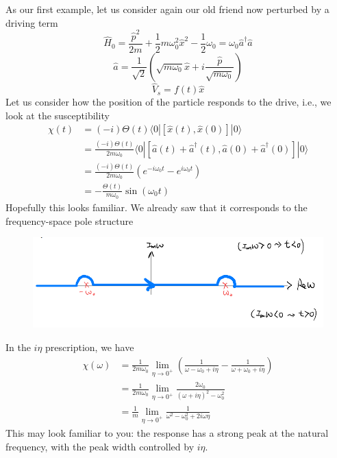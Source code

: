 As our first example, let us consider again our old friend now perturbed by a driving term
\[ \hat{H}_0=\frac{\hat{p}^2}{2m}+\frac{1}{2}m\omega _{0}^{2}\hat{x}^2-\frac{1}{2}\omega _0=\omega _0\hat{a}^{\dagger}\hat{a}\]
\[ \hat{a}=\frac{1}{\sqrt{2}}\left( \sqrt{m\omega _0}\hat{x}+i\frac{\hat{p}}{\sqrt{m\omega _0}} \right) \]
\[ \hat{V}_s=f\left( t \right) \hat{x}\]
Let us consider how the position of the particle responds to the drive, i.e., we look at the susceptibility
\begin{align*}
    \chi \left( t \right) &=\left( -i \right) \Theta \left( t \right) \langle 0|\left[ \hat{x}\left( t \right) ,\hat{x}\left( 0 \right) \right] |0\rangle \\
    &=\frac{\left( -i \right) \Theta \left( t \right)}{2m\omega _0}\langle 0|\left[ \hat{a}\left( t \right) +\hat{a}^{\dagger}\left( t \right) ,\hat{a}\left( 0 \right) +\hat{a}^{\dagger}\left( 0 \right) \right] |0\rangle \\
    &=\frac{\left( -i \right) \Theta \left( t \right)}{2m\omega _0}\left( e^{-i\omega _0t}-e^{i\omega _0t} \right) \\
    &=-\frac{\Theta \left( t \right)}{m\omega _0}\sin \left( \omega _0t \right)
\end{align*}
Hopefully this looks familiar. We already saw that it corresponds to the frequency-space pole structure

\begin{figure}[ht]
    \centering
    \includegraphics[width=\textwidth]{jupyterbook/data/fig/lec13-fig00.png}
\end{figure}

In the $i\eta$ prescription, we have
\begin{align*}
    \chi \left( \omega \right) &=\frac{1}{2m\omega _0}\lim_{\eta \rightarrow 0^+} \left( \frac{1}{\omega -\omega _0+i\eta}-\frac{1}{\omega +\omega _0+i\eta} \right) \\
    &=\frac{1}{2m\omega _0}\lim_{\eta \rightarrow 0^+} \frac{2\omega _0}{\left( \omega +i\eta \right) ^2-\omega _{0}^{2}}\\
    &=\frac{1}{m}\lim_{\eta \rightarrow 0^+} \frac{1}{\omega ^2-\omega _{0}^{2}+2i\omega \eta}
\end{align*}
This may look familiar to you: the response has a strong peak at the natural frequency, with the peak width controlled by $i\eta$.

